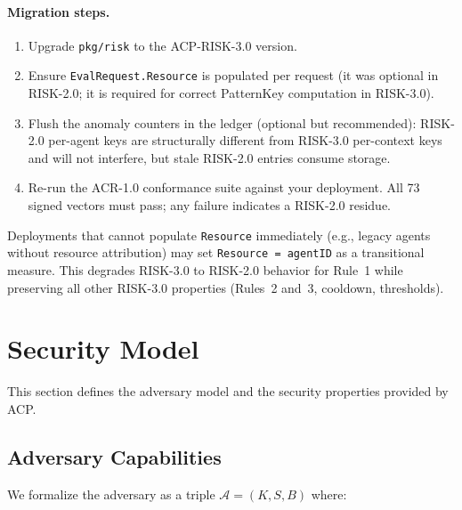\documentclass[11pt]{article}
\theoremstyle{definition}
\begin{document}
\paragraph{Migration steps.}
\begin{enumerate}[noitemsep]
  \item Upgrade \texttt{pkg/risk} to the ACP-RISK-3.0 version.
  \item Ensure \texttt{EvalRequest.Resource} is populated per request
    (it was optional in RISK-2.0; it is required for correct PatternKey computation in RISK-3.0).
  \item Flush the anomaly counters in the ledger (optional but recommended):
    RISK-2.0 per-agent keys are structurally different from RISK-3.0 per-context keys
    and will not interfere, but stale RISK-2.0 entries consume storage.
  \item Re-run the ACR-1.0 conformance suite against your deployment.
    All 73 signed vectors must pass; any failure indicates a RISK-2.0 residue.
\end{enumerate}

\noindent Deployments that cannot populate \texttt{Resource} immediately
(e.g., legacy agents without resource attribution)
may set \texttt{Resource = agentID} as a transitional measure.
This degrades RISK-3.0 to RISK-2.0 behavior for Rule~1 while preserving
all other RISK-3.0 properties (Rules~2 and~3, cooldown, thresholds).

\section{Security Model}
\label{sec:security-model}

This section defines the adversary model and the security properties provided by ACP.

\subsection{Adversary Capabilities}
\label{sec:adversary-model}

We formalize the adversary as a triple $\mathcal{A} = (K, S, B)$ where:
\end{document}
